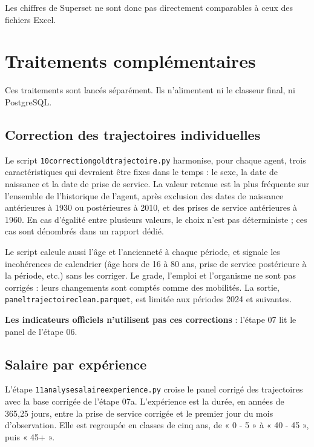 \documentclass[12pt,a4paper,french]{article}
\renewcommand{\_}{\underscoreorigine\allowbreak}
\begin{document}
Les chiffres de Superset ne sont donc pas directement comparables à ceux des fichiers Excel.

\section{Traitements complémentaires}\label{sec:complementaires}

Ces traitements sont lancés séparément. Ils n'alimentent ni le classeur final, ni PostgreSQL.

\subsection{Correction des trajectoires individuelles}

Le script \texttt{10\_correction\_gold\_trajectoire.py} harmonise, pour chaque agent, trois caractéristiques qui devraient être fixes dans le temps : le sexe, la date de naissance et la date de prise de service. La valeur retenue est la plus fréquente sur l'ensemble de l'historique de l'agent, après exclusion des dates de naissance antérieures à 1930 ou postérieures à 2010, et des prises de service antérieures à 1960. En cas d'égalité entre plusieurs valeurs, le choix n'est pas déterministe ; ces cas sont dénombrés dans un rapport dédié.

Le script calcule aussi l'âge et l'ancienneté à chaque période, et signale les incohérences de calendrier (âge hors de 16 à 80 ans, prise de service postérieure à la période, etc.) sans les corriger. Le grade, l'emploi et l'organisme ne sont pas corrigés : leurs changements sont comptés comme des mobilités. La sortie, \texttt{panel\_trajectoire\_clean.parquet}, est limitée aux périodes 2024 et suivantes.

\textbf{Les indicateurs officiels n'utilisent pas ces corrections} : l'étape 07 lit le panel de l'étape 06.

\subsection{Salaire par expérience}

L'étape \texttt{11\_analyse\_salaire\_experience.py} croise le panel corrigé des trajectoires avec la base corrigée de l'étape 07a. L'expérience est la durée, en années de 365,25 jours, entre la prise de service corrigée et le premier jour du mois d'observation. Elle est regroupée en classes de cinq ans, de « 0 - 5 » à « 40 - 45 », puis « 45+ ».
\end{document}
